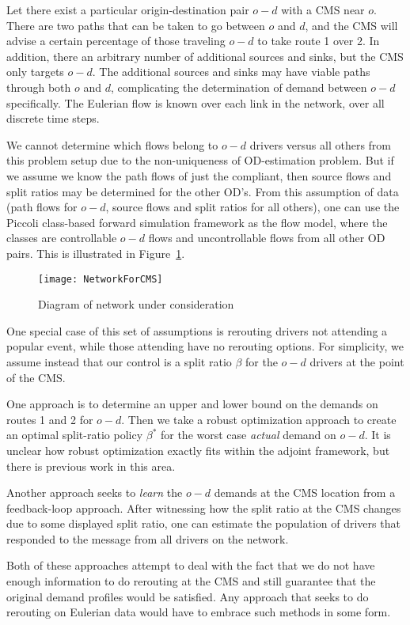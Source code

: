Let there exist a particular origin-destination pair $o-d$ with a
CMS near $o$. There are two paths that can be taken to go between
$o$ and $d$, and the CMS will advise a certain percentage of those
traveling $o-d$ to take route 1 over 2. In addition, there an arbitrary
number of additional sources and sinks, but the CMS only targets $o-d$.
The additional sources and sinks may have viable paths through both
$o$ and $d$, complicating the determination of demand between $o-d$
specifically. The Eulerian flow is known over each link in the network,
over all discrete time steps. 

We cannot determine which flows belong to $o-d$ drivers versus all
others from this problem setup due to the non-uniqueness of OD-estimation
problem. But if we assume we know the path flows of just the compliant,
then source flows and split ratios may be determined for the other
OD's. From this assumption of data (path flows for $o-d$, source
flows and split ratios for all others), one can use the Piccoli class-based
forward simulation framework as the flow model, where the classes
are controllable $o-d$ flows and uncontrollable flows from all other
OD pairs. This is illustrated in Figure~\ref{fig:Diagram-of-network}.
\begin{figure}
\begin{centering}
\texttt{[image: NetworkForCMS]}
\par\end{centering}

\caption{Diagram of network under consideration\label{fig:Diagram-of-network}}
\end{figure}


One special case of this set of assumptions is rerouting drivers not
attending a popular event, while those attending have no rerouting
options. For simplicity, we assume instead that our control is a split
ratio $\beta$ for the $o-d$ drivers at the point of the CMS.

One approach is to determine an upper and lower bound on the demands
on routes 1 and 2 for $o-d$. Then we take a robust optimization approach
to create an optimal split-ratio policy $\beta^{*}$ for the worst
case \emph{actual} demand on $o-d$. It is unclear how robust optimization
exactly fits within the adjoint framework, but there is previous work
in this area.

Another approach seeks to \emph{learn} the $o-d$ demands at the CMS
location from a feedback-loop approach. After witnessing how the split
ratio at the CMS changes due to some displayed split ratio, one can
estimate the population of drivers that responded to the message from
all drivers on the network.

Both of these approaches attempt to deal with the fact that we do
not have enough information to do rerouting at the CMS and still guarantee
that the original demand profiles would be satisfied. Any approach
that seeks to do rerouting on Eulerian data would have to embrace
such methods in some form.
